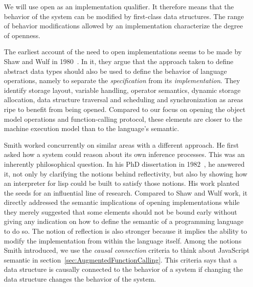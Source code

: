 We will use open as an implementation qualifier. It therefore means that
the behavior of the system can be modified by first-class data structures. The
range of behavior modifications allowed by an implementation characterize the
degree of openness.

The earliest account of the need to open implementations seems to be made by
Shaw and Wulf in 1980~\cite{Shaw:1980}. In it, they argue that the approach
taken to define abstract data types should also be used to define the behavior
of language operations, namely to separate the \textit{specification} from its
\textit{implementation}. They identify storage layout, variable handling,
operator semantics, dynamic storage allocation, data structure traversal and
scheduling and synchronization as areas ripe to benefit from being opened.
Compared to our focus on opening the object model operations and
function-calling protocol, these elements are closer to the machine execution
model than to the language's semantic. 

Smith worked concurrently on similar areas with a different approach. He
first asked how a system could reason about its own inference processes. This
was an inherently philosophical question. In his PhD dissertation in
1982~\cite{Smith:1982}, he answered it, not only by clarifying the notions
behind reflectivity, but also by showing how an interpreter for lisp could be
built to satisfy those notions. His work planted the seeds for an influential
line of research. Compared to Shaw and Wulf work, it directly addressed the
semantic implications of opening implementations while they merely suggested
that some elements should not be bound early without giving any indication on
how to define the semantic of a programming language to do so.  The notion of
reflection is also stronger because it implies the ability to modify the
implementation from within the language itself. Among the notions Smith
introduced, we use the \textit{causal connection} criteria to think about
JavaScript semantic in section~\ref{sec:AugmentedFunctionCalling}. This
criteria says that a data structure is causally connected to the behavior of a
system if changing the data structure changes the behavior of the system.

